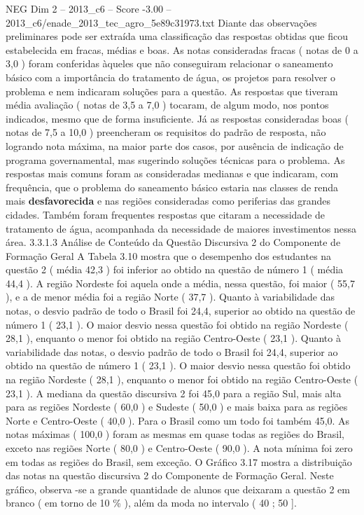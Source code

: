 \begin{textsample}{NEG Dim 2 – 2013\_c6 – Score -3.00 – 2013\_c6/enade\_2013\_tec\_agro\_5e89c31973.txt}
Diante das observações preliminares pode ser extraída uma classificação das respostas obtidas que ficou estabelecida em fracas, médias e boas.
As notas consideradas fracas ( notas de 0 a 3,0 ) foram conferidas àqueles que não conseguiram relacionar o saneamento básico com a importância do tratamento de água, os projetos para resolver o problema e nem indicaram soluções para a questão.
As respostas que tiveram média avaliação ( notas de 3,5 a 7,0 ) tocaram, de algum modo, nos pontos indicados, mesmo que de forma insuficiente.
Já as respostas consideradas boas ( notas de 7,5 a 10,0 ) preencheram os requisitos do padrão de resposta, não logrando nota máxima, na maior parte dos casos, por ausência de indicação de programa governamental, mas sugerindo soluções técnicas para o problema.
As respostas mais comuns foram as consideradas medianas e que indicaram, com frequência, que o problema do saneamento básico estaria nas classes de renda mais \textbf{desfavorecida} e nas regiões consideradas como periferias das grandes cidades.
Também foram frequentes respostas que citaram a necessidade de tratamento de água, acompanhada da necessidade de maiores investimentos nessa área. 3.3.1.3 Análise de Conteúdo da Questão Discursiva 2 do Componente de Formação Geral A Tabela 3.10 mostra que o desempenho dos estudantes na questão 2 ( média 42,3 ) foi inferior ao obtido na questão de número 1 ( média 44,4 ).
A região Nordeste foi aquela onde a média, nessa questão, foi maior ( 55,7 ), e a de menor média foi a região Norte ( 37,7 ).
Quanto à variabilidade das notas, o desvio padrão de todo o Brasil foi 24,4, superior ao obtido na questão de número 1 ( 23,1 ).
O maior desvio nessa questão foi obtido na região Nordeste ( 28,1 ), enquanto o menor foi obtido na região Centro-Oeste ( 23,1 ).
Quanto à variabilidade das notas, o desvio padrão de todo o Brasil foi 24,4, superior ao obtido na questão de número 1 ( 23,1 ).
O maior desvio nessa questão foi obtido na região Nordeste ( 28,1 ), enquanto o menor foi obtido na região Centro-Oeste ( 23,1 ).
A mediana da questão discursiva 2 foi 45,0 para a região Sul, mais alta para as regiões Nordeste ( 60,0 ) e Sudeste ( 50,0 ) e mais baixa para as regiões Norte e Centro-Oeste ( 40,0 ).
Para o Brasil como um todo foi também 45,0.
As notas máximas ( 100,0 ) foram as mesmas em quase todas as regiões do Brasil, exceto nas regiões Norte ( 80,0 ) e Centro-Oeste ( 90,0 ).
A nota mínima foi zero em todas as regiões do Brasil, sem exceção.
O Gráfico 3.17 mostra a distribuição das notas na questão discursiva 2 do Componente de Formação Geral.
Neste gráfico, observa -se a grande quantidade de alunos que deixaram a questão 2 em branco ( em torno de 10 \% ), além da moda no intervalo ( 40 ; 50 ].

\end{textsample}
